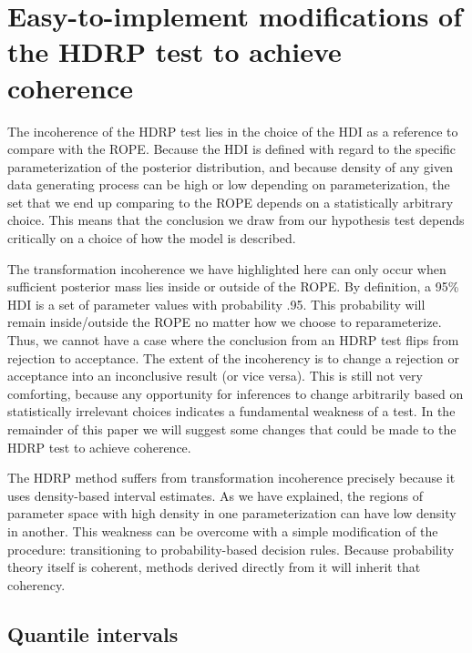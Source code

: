\documentclass[man]{apa}
\newcommand{\hdr}{HDRP}
\begin{document}

\section*{Easy-to-implement modifications of the \hdr{} test to achieve coherence}



The incoherence of the \hdr{} test lies in the choice of the HDI as a reference to compare with the ROPE. Because the HDI is defined with regard to the specific parameterization of the posterior distribution, and because density of any given data generating process can be high or low depending on parameterization, the set that we end up comparing to the ROPE depends on a statistically arbitrary choice. %
This means that the conclusion we draw from our hypothesis test depends critically on a choice of how the model is described. 

The transformation incoherence we have highlighted here can only occur when sufficient posterior mass lies inside or outside of the ROPE. By definition, a 95\% HDI is a set of parameter values with probability .95. This probability will remain inside/outside the ROPE no matter how we choose to reparameterize. Thus, we cannot have a case where the conclusion from an \hdr{} test flips from rejection to acceptance. The extent of the incoherency is to change a rejection or acceptance into an inconclusive result (or vice versa). This is still not very comforting, because any opportunity for inferences to change arbitrarily based on statistically irrelevant choices indicates a fundamental weakness of a test. In the remainder of this paper we will suggest some changes that could be made to the \hdr{} test to achieve coherence.

The \hdr{} method suffers from transformation incoherence precisely because it uses density-based interval estimates. As we have explained, the regions of parameter space with high density in one parameterization can have low density in another. This weakness can be overcome with a simple modification of the procedure: transitioning to probability-based decision rules. Because probability theory itself is coherent, methods derived directly from it will inherit that coherency. 

\subsection*{Quantile intervals}
\end{document}
